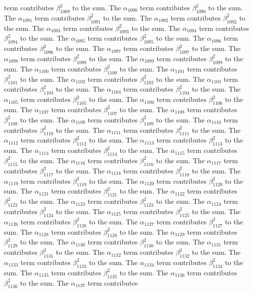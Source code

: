 \begin{lemma}
term contributes $\beta_{1089}^{2}$ to the sum. The $\alpha_{1090}$ term contributes $\beta_{1090}^{2}$ to the sum. The $\alpha_{1091}$ term contributes $\beta_{1091}^{2}$ to the sum. The $\alpha_{1092}$ term contributes $\beta_{1092}^{2}$ to the sum. The $\alpha_{1093}$ term contributes $\beta_{1093}^{2}$ to the sum. The $\alpha_{1094}$ term contributes $\beta_{1094}^{2}$ to the sum. The $\alpha_{1095}$ term contributes $\beta_{1095}^{2}$ to the sum. The $\alpha_{1096}$ term contributes $\beta_{1096}^{2}$ to the sum. The $\alpha_{1097}$ term contributes $\beta_{1097}^{2}$ to the sum. The $\alpha_{1098}$ term contributes $\beta_{1098}^{2}$ to the sum. The $\alpha_{1099}$ term contributes $\beta_{1099}^{2}$ to the sum. The $\alpha_{1100}$ term contributes $\beta_{1100}^{2}$ to the sum. The $\alpha_{1101}$ term contributes $\beta_{1101}^{2}$ to the sum. The $\alpha_{1102}$ term contributes $\beta_{1102}^{2}$ to the sum. The $\alpha_{1103}$ term contributes $\beta_{1103}^{2}$ to the sum. The $\alpha_{1104}$ term contributes $\beta_{1104}^{2}$ to the sum. The $\alpha_{1105}$ term contributes $\beta_{1105}^{2}$ to the sum. The $\alpha_{1106}$ term contributes $\beta_{1106}^{2}$ to the sum. The $\alpha_{1107}$ term contributes $\beta_{1107}^{2}$ to the sum. The $\alpha_{1108}$ term contributes $\beta_{1108}^{2}$ to the sum. The $\alpha_{1109}$ term contributes $\beta_{1109}^{2}$ to the sum. The $\alpha_{1110}$ term contributes $\beta_{1110}^{2}$ to the sum. The $\alpha_{1111}$ term contributes $\beta_{1111}^{2}$ to the sum. The $\alpha_{1112}$ term contributes $\beta_{1112}^{2}$ to the sum. The $\alpha_{1113}$ term contributes $\beta_{1113}^{2}$ to the sum. The $\alpha_{1114}$ term contributes $\beta_{1114}^{2}$ to the sum. The $\alpha_{1115}$ term contributes $\beta_{1115}^{2}$ to the sum. The $\alpha_{1116}$ term contributes $\beta_{1116}^{2}$ to the sum. The $\alpha_{1117}$ term contributes $\beta_{1117}^{2}$ to the sum. The $\alpha_{1118}$ term contributes $\beta_{1118}^{2}$ to the sum. The $\alpha_{1119}$ term contributes $\beta_{1119}^{2}$ to the sum. The $\alpha_{1120}$ term contributes $\beta_{1120}^{2}$ to the sum. The $\alpha_{1121}$ term contributes $\beta_{1121}^{2}$ to the sum. The $\alpha_{1122}$ term contributes $\beta_{1122}^{2}$ to the sum. The $\alpha_{1123}$ term contributes $\beta_{1123}^{2}$ to the sum. The $\alpha_{1124}$ term contributes $\beta_{1124}^{2}$ to the sum. The $\alpha_{1125}$ term contributes $\beta_{1125}^{2}$ to the sum. The $\alpha_{1126}$ term contributes $\beta_{1126}^{2}$ to the sum. The $\alpha_{1127}$ term contributes $\beta_{1127}^{2}$ to the sum. The $\alpha_{1128}$ term contributes $\beta_{1128}^{2}$ to the sum. The $\alpha_{1129}$ term contributes $\beta_{1129}^{2}$ to the sum. The $\alpha_{1130}$ term contributes $\beta_{1130}^{2}$ to the sum. The $\alpha_{1131}$ term contributes $\beta_{1131}^{2}$ to the sum. The $\alpha_{1132}$ term contributes $\beta_{1132}^{2}$ to the sum. The $\alpha_{1133}$ term contributes $\beta_{1133}^{2}$ to the sum. The $\alpha_{1134}$ term contributes $\beta_{1134}^{2}$ to the sum. The $\alpha_{1135}$ term contributes $\beta_{1135}^{2}$ to the sum. The $\alpha_{1136}$ term contributes $\beta_{1136}^{2}$ to the sum. The $\alpha_{1137}$ term contributes 
\end{lemma}
